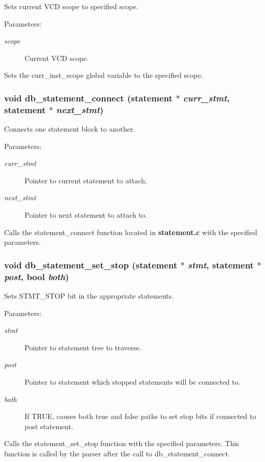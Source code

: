 Sets current VCD scope to specified scope.

\begin{Desc}
\item[Parameters: ]\par
\begin{description}
\item[{\em 
scope}]Current VCD scope.\end{description}
\end{Desc}
Sets the curr\_\-inst\_\-scope global variable to the specified scope. 
\subsubsection{\setlength{\rightskip}{0pt plus 5cm}void db\_\-statement\_\-connect ({\bf statement} $\ast$ {\em curr\_\-stmt}, {\bf statement} $\ast$ {\em next\_\-stmt})}\label{db_8h_a12}


Connects one statement block to another.

\begin{Desc}
\item[Parameters: ]\par
\begin{description}
\item[{\em 
curr\_\-stmt}]Pointer to current statement to attach. \item[{\em 
next\_\-stmt}]Pointer to next statement to attach to.\end{description}
\end{Desc}
Calls the statement\_\-connect function located in {\bf statement.c} with the specified parameters. 
\subsubsection{\setlength{\rightskip}{0pt plus 5cm}void db\_\-statement\_\-set\_\-stop ({\bf statement} $\ast$ {\em stmt}, {\bf statement} $\ast$ {\em post}, {\bf bool} {\em both})}\label{db_8h_a13}


Sets STMT\_\-STOP bit in the appropriate statements.

\begin{Desc}
\item[Parameters: ]\par
\begin{description}
\item[{\em 
stmt}]Pointer to statement tree to traverse. \item[{\em 
post}]Pointer to statement which stopped statements will be connected to. \item[{\em 
both}]If TRUE, causes both true and false paths to set stop bits if connected to post statement.\end{description}
\end{Desc}
Calls the statement\_\-set\_\-stop function with the specified parameters. This function is called by the parser after the call to db\_\-statement\_\-connect. 
